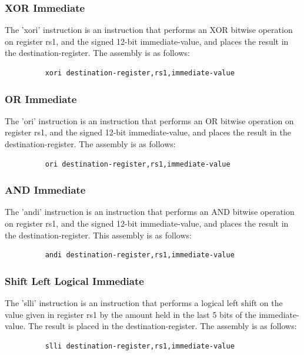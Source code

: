 \subsubsection{XOR Immediate}
\qquad
The 'xori' instruction is an instruction that performs an XOR bitwise operation on register rs1, and the signed 12-bit immediate-value, and places the result in the destination-register. The assembly is as follows:
\begin{figure}[!htbp]
    \centering
    \begin{verbatim}
    xori destination-register,rs1,immediate-value
    \end{verbatim}
\end{figure}\newline

\subsubsection{OR Immediate}
\qquad
The 'ori' instruction is an instruction that performs an OR bitwise operation on register rs1, and the signed 12-bit immediate-value, and places the result in the destination-register. The assembly is as follows:
\begin{figure}[!htbp]
    \centering
    \begin{verbatim}
    ori destination-register,rs1,immediate-value
    \end{verbatim}
\end{figure}\newline

\subsubsection{AND Immediate}
\qquad
The 'andi' instruction is an instruction that performs an AND bitwise operation on register rs1, and the signed 12-bit immediate-value, and places the result in the destination-register. This assembly is as follows:
\begin{figure}[!htbp]
    \centering
    \begin{verbatim}
    andi destination-register,rs1,immediate-value
    \end{verbatim}
\end{figure}\newline

\subsubsection{Shift Left Logical Immediate}
\qquad
The 'slli' instruction is an instruction that performs a logical left shift on the value given in register rs1 by the amount held in the last 5 bits of the immediate-value. The result is placed in the destination-register. The assembly is as follows:
\begin{figure}[!htbp]
    \centering
    \begin{verbatim}
    slli destination-register,rs1,immediate-value
    \end{verbatim}
\end{figure}\newline

